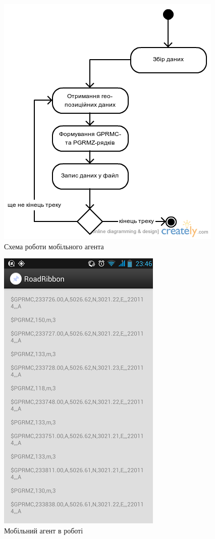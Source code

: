 \documentclass[simple,a4paper,14pt,ukrainian,utf8]{eskdtext}
\begin{document}
	\vspace{2em}
	\begin{figure}
		\centering \includegraphics[scale=0.5]{images/mobile_agent_workflow.png}
		\caption{Схема роботи мобільного агента}
	\end{figure}
	
	\vspace{2em}
	\begin{figure}
		\centering \includegraphics[scale=0.75]{images/mobile_screen.png}
		\caption{Мобільний агент в роботі}
	\end{figure}
        
\end{document}
